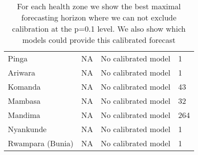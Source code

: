 \begin{table}[ht]
\begin{tabular}{|l|l|p{8cm}|l|}
  Pinga & NA & No calibrated model & 1 \\ 
  Ariwara & NA & No calibrated model & 1 \\ 
  Komanda & NA & No calibrated model & 43 \\ 
  Mambasa & NA & No calibrated model & 32 \\ 
  Mandima & NA & No calibrated model & 264 \\ 
  Nyankunde & NA & No calibrated model & 1 \\ 
  Rwampara (Bunia) & NA & No calibrated model & 1 \\ 
   \hline
\end{tabular}
\caption{For each health zone we show the best maximal forecasting horizon where we can not exclude calibration at the p=0.1 level. We also show which models could provide this calibrated forecast} 
\label{tab:best_model}
\end{table}
